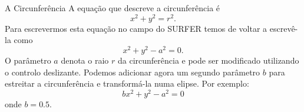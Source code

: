 \begin{surferPage}{A Circunferência}
A equa\c c\~ao que descreve a circunfer\^encia \'e
\[x^2+y^2=r^2.\]
Para escrevermos esta equa\c c\~ao no campo do SURFER temos de voltar a escrev\^e-la como
\[x^2+y^2-a^2=0.\]
O par\^ametro $a$ denota o raio $r$ da circunfer\^encia e pode ser modificado utilizando o controlo deslizante. Podemos adicionar agora um segundo par\^ametro $b$ para estreitar a circunfer\^encia e transform\'a-la numa elipse. Por exemplo:
\[bx^2+y^2-a^2=0\] onde $b=0.5$.
\end{surferPage}
